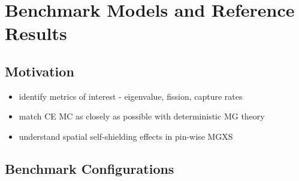 \chapter{Benchmark Models and Reference Results}
\label{chap:benchmarks}

\section{Motivation}
\label{sec:chap7-motivate}

\begin{itemize}[noitemsep]
  \item identify metrics of interest - eigenvalue, fission, capture rates
  \item match CE MC as closely as possible with deterministic MG theory
  \item understand spatial self-shielding effects in pin-wise MGXS
\end{itemize}


\section{Benchmark Configurations}
\label{sec:chap7-benchmarks}

